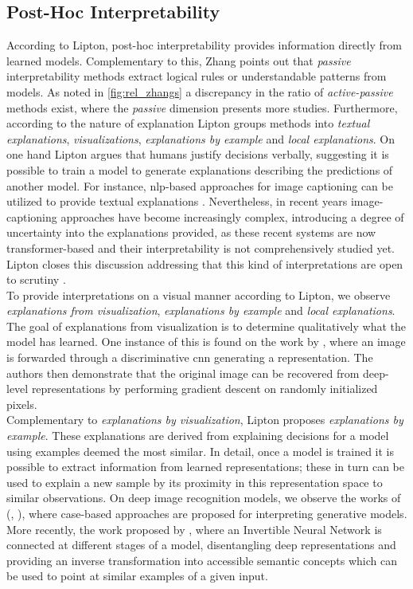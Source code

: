 \subsection{Post-Hoc Interpretability}
\label{rel:sub_post}
According to Lipton, post-hoc interpretability provides information directly from learned models. 
Complementary to this, Zhang points out that \emph{passive} interpretability methods extract 
logical rules or understandable patterns from models. As noted in \autoref{fig:rel_zhangs} a 
discrepancy in the ratio of \emph{active-passive} methods exist, where the \emph{passive} 
dimension presents more studies. Furthermore, according to the nature of 
explanation Lipton groups methods into \emph{textual explanations}, \emph{visualizations}, 
\emph{explanations by example} and \emph{local explanations}. On one hand Lipton argues that 
humans justify decisions verbally, suggesting it is possible to train a model to generate 
explanations describing the predictions of another model. For instance, \gls{nlp}-based approaches 
for image captioning can be utilized to provide textual explanations \autocite{mcauley2013hidden}. 
Nevertheless, in recent years image-captioning approaches have become increasingly complex,
introducing a degree of uncertainty into the explanations provided, as these recent systems 
are now transformer-based and their interpretability is not comprehensively studied yet. Lipton 
closes this discussion addressing that this kind of interpretations are open to scrutiny 
\autocite{chang2009reading}.\\

To provide interpretations on a visual manner according to Lipton, we observe \emph{explanations 
from visualization}, \emph{explanations by example} and \emph{local explanations}. The goal of 
explanations from visualization is to determine qualitatively what the model has learned. One 
instance of this is found on the work by \cite{mahendran2015understanding}, where an image is 
forwarded through a discriminative \gls{cnn} generating a representation. The authors then 
demonstrate that the original image can be recovered from deep-level representations by performing 
gradient descent on randomly initialized pixels.\\

Complementary to \emph{explanations by visualization}, Lipton proposes \emph{explanations by 
example}. These explanations are derived from explaining decisions for a model using examples 
deemed the most similar. In detail, once a model is trained it is possible to extract information 
from learned representations; these in turn can be used to explain a new sample by its proximity 
in this representation space to similar observations. On deep image recognition models, we observe 
the works of (\cite{kim2014bayesian}, \cite{doshi2015graph}), where case-based approaches are 
proposed for interpreting generative models. More recently, the work proposed by 
\cite{rombach2020making}, where an Invertible Neural Network is connected at different stages of a 
model, disentangling deep representations and providing an inverse transformation into accessible 
semantic concepts which can be used to point at similar examples of a given input.\\

